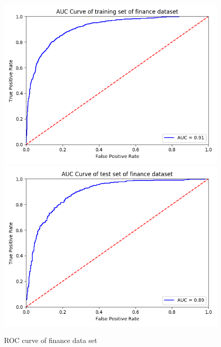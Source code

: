\documentclass{article}
\begin{document}
\begin{figure}[h]
  \centering
  \includegraphics[scale=0.3]{auc_finance_train.png}
  \includegraphics[scale=0.3]{auc_finance_test.png}
  \caption{ROC curve of finance data set}
\end{figure}
\end{document}
